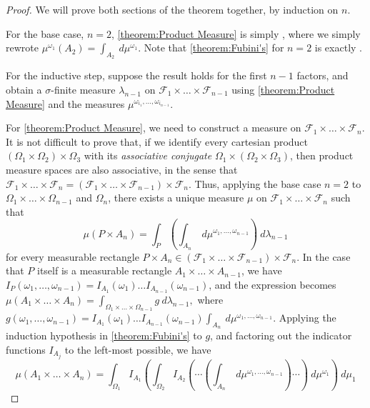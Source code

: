 \begin{proof}
We will prove both sections of the theorem together, by induction on \(n\).

For the base case, \(n=2\), \ref{theorem:Product Measure} is simply , where we simply rewrote \(\mu^{\omega_1}(A_2)=\int_{A_2}~d\mu^{\omega_1}\). Note that \ref{theorem:Fubini's} for \(n=2\) is exactly .

For the inductive step, suppose the result holds for the first \(n-1\) factors, and obtain a \(\sigma\)-finite measure \(\lambda_{n-1}\) on \(\mathcal{F}_{1}\times\dots\times\mathcal{F}_{n-1}\) using \ref{theorem:Product Measure} and the measures \(\mu^{\omega_{i_{1}}, \dots , \omega_{i_{n-1}}}\). 

For \ref{theorem:Product Measure}, we need to construct a measure
on \(\mathcal{F}_{1}\times\dots\times\mathcal{F}_{n}\). It is not difficult
to prove that, if we identify every cartesian product \( (\Omega_1\times
\Omega_2)\times \Omega_3\) with its \emph{associative conjugate}
\(\Omega_1\times(\Omega_2\times \Omega_3)\), then product measure spaces
are also associative, in the sense that
\(\mathcal{F}_1\times\dots\times\mathcal{F}_{n}=\left(\mathcal{F}_1\times\dots\times\mathcal{F}_{n-1}\right)\times\mathcal{F}_{n}\).
Thus, applying the base case \(n=2\) to \(\Omega_{1}\times\dots\times\Omega_{n-1}\) and \(\Omega_n\), there exists a unique measure \(\mu\) on \(\mathcal{F}_{1}\times\dots\times\mathcal{F}_{n}\) such that
\[
    \mu(P\times A_{n})=\int_{P}\left(\int_{A_n}~d\mu^{\omega_{1},\dots,\omega_{n-1}}\right)~d\lambda_{n-1}
\]
for every measurable rectangle \(P\times A_n\in\left(\mathcal{F}_{1}\times \dots \times \mathcal{F}_{n-1} \right)\times\mathcal{F}_n\). In the case that \(P\) itself is a measurable rectangle \(A_{1}\times \dots \times A_{n-1}\), we have \(I_P(\omega_{1}, \dots , \omega_{n-1})=I_{A_1}(\omega_1)\dots I_{A_{n-1}}(\omega_{n-1})\), and the expression becomes
\(
    \mu(A_{1}\times \dots \times A_{n})=\int_{\Omega_{1}\times \dots \times \Omega_{n-1}}g~d\lambda_{n-1}
,\)
where \(g(\omega_{1}, \dots , \omega_{n-1})=I_{A_1}(\omega_1)\dots I_{A_{n-1}}(\omega_{n-1})\int_{A_n}~d\mu^{\omega_{1}, \dots , \omega_{n-1}}\). Applying the induction hypothesis in \ref{theorem:Fubini's} to \(g\), and factoring out the indicator functions \(I_{A_j}\) to the left-most possible, we have
\[
    \mu(A_{1}\times \dots \times A_{n})=\int_{\Omega_1}I_{A_1}\left(\int_{\Omega_2}I_{A_2}\left(\dotsm\left(\int_{A_n}~d\mu^{\omega_{1}, \dots , \omega_{n-1}}\right)\dotsm\right)~d\mu^{\omega_1}\right)~d\mu_1
\]
\end{proof}
